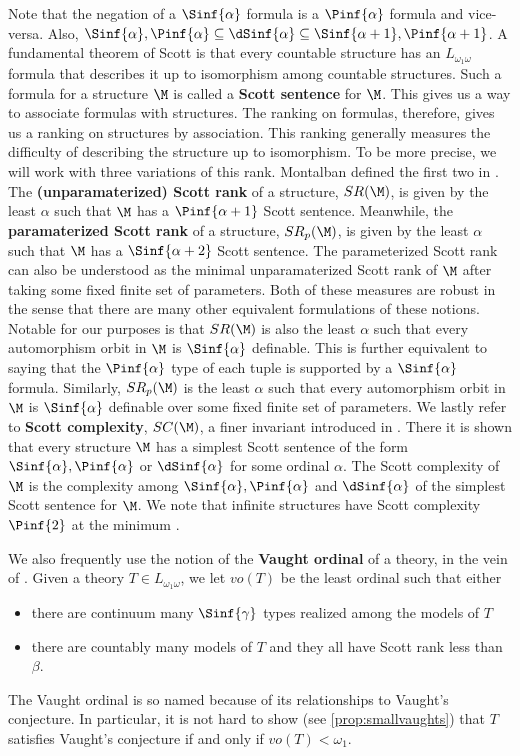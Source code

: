 \documentclass[10pt,a4paper]{amsart}
\renewcommand{\-}{\text{-}}
\begin{document}
Note that the negation of a $\Sinf{\alpha}$ formula is a $ \Pinf{\alpha}$ formula and vice-versa.
Also, $\Sinf{\alpha}, \Pinf{\alpha}\subseteq \dSinf{\alpha}\subseteq \Sinf{\alpha+1}, \Pinf{\alpha+1}$.
A fundamental theorem of Scott \cite{Sco65} is that every countable structure has an $L_{\omega_1\omega}$ formula that describes it up to isomorphism among countable structures.
Such a formula for a structure $\M$ is called a \textbf{Scott sentence} for $\M$.
This gives us a way to associate formulas with structures.
The ranking on formulas, therefore, gives us a ranking on structures by association.
This ranking generally measures the difficulty of describing the structure up to isomorphism.
To be more precise, we will work with three variations of this rank.
Montalban defined the first two in \cite{MonSR}.
The \textbf{(unparamaterized) Scott rank} of a structure, $SR(\M)$, is given by the least $\alpha$ such that $\M$ has a $\Pinf{\alpha+1}$ Scott sentence.
Meanwhile, the \textbf{paramaterized Scott rank} of a structure, $SR_p(\M)$, is given by the least $\alpha$ such that $\M$ has a $\Sinf{\alpha+2}$ Scott sentence.
The parameterized Scott rank can also be understood as the minimal unparamaterized Scott rank of $\M$ after taking some fixed finite set of parameters.
Both of these measures are robust in the sense that there are many other equivalent formulations of these notions.
Notable for our purposes is that $SR(\M)$ is also the least $\alpha$ such that every automorphism orbit in $\M$ is $\Sinf{\alpha}$ definable.
This is further equivalent to saying that the $\Pinf{\alpha}$ type of each tuple is supported by a $\Sinf{\alpha}$ formula. 
Similarly, $SR_p(\M)$ is the least $\alpha$ such that every automorphism orbit in $\M$ is $\Sinf{\alpha}$ definable over some fixed finite set of parameters.
We lastly refer to \textbf{Scott complexity}, $SC(\M)$, a finer invariant introduced in \cite{AGNHTT}.
There it is shown that every structure $\M$ has a simplest Scott sentence of the form $\Sinf{\alpha}, \Pinf{\alpha}$ or $\dSinf{\alpha}$ for some ordinal $\alpha$.
The Scott complexity of $\M$ is the complexity among $\Sinf{\alpha}, \Pinf{\alpha}$ and $\dSinf{\alpha}$ of the simplest Scott sentence for $\M$.
We note that infinite structures have Scott complexity $\Pinf{2}$ at the minimum \cite[Theorem 5.1]{AGNHTT,miller1983}.

We also frequently use the notion of the \textbf{Vaught ordinal} of a theory, in the vein of \cite{GM23}.
Given a theory $T\in  L_{\omega_1\omega}$, we let $vo(T)$ be the least ordinal such that either
\begin{itemize}
	\item there are continuum many $\Sinf{\gamma}$ types realized among the models of $T$
	\item there are countably many models of $T$ and they all have Scott rank less than $\beta$.
\end{itemize}
The Vaught ordinal is so named because of its relationships to Vaught's conjecture.
In particular, it is not hard to show (see \cref{prop:smallvaughts}) that $T$ satisfies Vaught's conjecture if and only if $vo(T)<\omega_1$.
\end{document}
